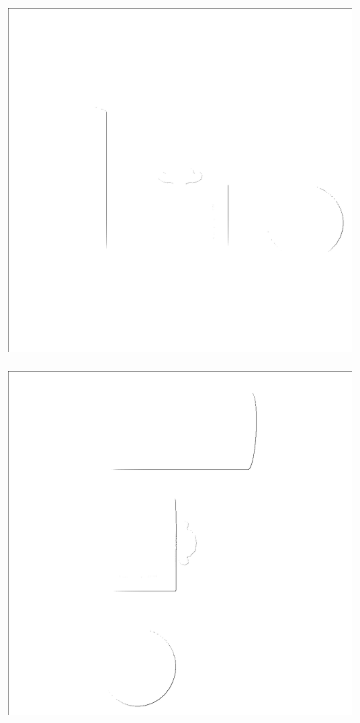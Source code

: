 \begin{figure}[b!]
    \begin{subfigure}[t]{0.32\textwidth}
        \includegraphics[width=\linewidth]{chapter04/img/bearing-diag-0001.png}
    \end{subfigure}
    \begin{subfigure}[t]{0.32\textwidth}
        \includegraphics[width=\linewidth]{chapter04/img/bearing-diag-0030.png}

\end{subfigure}
\end{figure}
